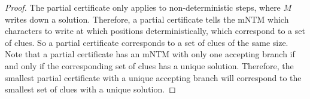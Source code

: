\documentclass[runningheads,a4paper]{llncs}
\begin{document}
\begin{proof}
The partial certificate only applies to non-deterministic steps, where $M$ writes down a solution. Therefore, a partial certificate tells the mNTM which characters to write at which positions deterministically, which correspond to a set of clues. So a partial certificate corresponds to a set of clues of the same size. Note that a partial certificate has an mNTM with only one accepting branch if and only if the corresponding set of clues has a unique solution. Therefore, the smallest partial certificate with a unique accepting branch will correspond to the smallest set of clues with a unique solution.

\end{proof}
\end{document}
